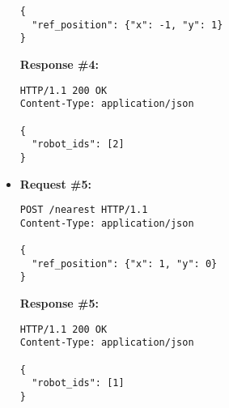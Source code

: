\begin{itemize}
\begin{lstlisting}[xleftmargin=1pc,numbers=none]
{
  "ref_position": {"x": -1, "y": 1}
}
\end{lstlisting}
\textbf{Response \#4:}
\begin{lstlisting}[xleftmargin=1pc,numbers=none]
HTTP/1.1 200 OK
Content-Type: application/json

{
  "robot_ids": [2]
}
\end{lstlisting}

\item  %
\textbf{Request \#5:}
\begin{lstlisting}[xleftmargin=1pc,numbers=none]
POST /nearest HTTP/1.1
Content-Type: application/json

{
  "ref_position": {"x": 1, "y": 0}
}
\end{lstlisting}
\newpage
\textbf{Response \#5:}
\begin{lstlisting}[xleftmargin=1pc,numbers=none]
HTTP/1.1 200 OK
Content-Type: application/json

{
  "robot_ids": [1]
}
\end{lstlisting}
\end{itemize}
